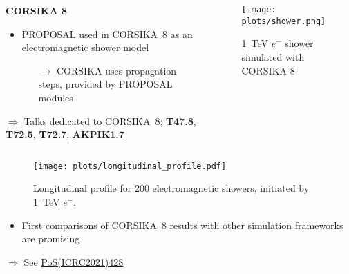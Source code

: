 \begin{frame}[c]
    \begin{columns}[onlytextwidth]
    \begin{column}{0.6\textwidth}
    \textbf{CORSIKA 8}
        \begin{itemize}
            \item PROPOSAL used in CORSIKA~8 as an electromagnetic shower model
            \begin{itemize}
                \item[$\rightarrow$] CORSIKA uses propagation steps, provided by PROPOSAL modules
            \end{itemize}
        \end{itemize}

        \hspace{10pt} $\Rightarrow$ Talks dedicated to CORSIKA~8: \href{https://www.dpg-verhandlungen.de/year/2022/conference/heidelberg/part/t/session/47/contribution/8}{\textbf{T47.8}}, \href{https://www.dpg-verhandlungen.de/year/2022/conference/heidelberg/part/t/session/72/contribution/5}{\textbf{T72.5}}, \href{https://www.dpg-verhandlungen.de/year/2022/conference/heidelberg/part/t/session/72/contribution/7}{\textbf{T72.7}}, \href{https://www.dpg-verhandlungen.de/year/2022/conference/heidelberg/part/akpik/session/1/contribution/7}{\textbf{AKPIK1.7}}

    \end{column}
        \begin{column}{0.4\textwidth}
            \begin{figure}
                \centering
                \texttt{[image: plots/shower.png]}
                \caption*{\SI{1}{\tera\electronvolt} $e^-$ shower simulated with CORSIKA 8}
            \end{figure}
        \end{column}
    \end{columns}
\end{frame}


\begin{frame}[c]
    \begin{figure}
        \centering
        \texttt{[image: plots/longitudinal\_profile.pdf]}
        \caption*{Longitudinal profile for 200 electromagnetic showers, initiated by \SI{1}{\tera\electronvolt} $e^-$.}
    \end{figure}
    \begin{itemize}
        \item First comparisons of CORSIKA~8 results with other simulation frameworks are promising
    \end{itemize}

    \hspace{20pt} $\Rightarrow$ See \href{https://pos.sissa.it/395/428/}{PoS(ICRC2021)428}

\end{frame}



